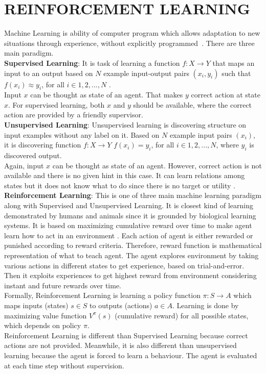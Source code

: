 \chapter{REINFORCEMENT LEARNING}
\label{chap:rl_chap}
Machine Learning is ability of computer program which allows adaptation to new situations through experience, without explicitly programmed~\cite{mitchell_machine_1997}. There are three main paradigm. \\
\textbf{Supervised Learning}: It is task of learning a function $f \colon X \rightarrow Y$ that maps an input to an output based on $N$ example input-output pairs $(x_i,y_i)$ such that $ f(x_i) \approx y_i$, for all $i \in {1,2,...,N}$ \cite{russell_artificial_nodate}. \\
Input $x$ can be thought as state of an agent. That makes $y$ correct action at state $x$. For supervised learning, both $x$ and $y$ should be available, where the correct action are provided by a friendly supervisor. \\
\textbf{Unsupervised Learning}:
Unsupervised learning is discovering structure on input examples without any label on it. Based on $N$ example input pairs $(x_i)$, it is discovering function $f \colon X \rightarrow Y$ $ f(x_i) = y_i$, for all $i \in {1,2,...,N} $, where $y_i$ is discovered output. \\
Again, input $x$ can be thought as state of an agent. However, correct action is not available and there is no given hint in this case. It can learn relations among states but it does not know what to do since there is no target or utility \cite{russell_artificial_nodate}. \\
\textbf{Reinforcement Learning}: This is one of three main machine learning paradigm along with Supervised and Unsupervised Learning. It is closest kind of learning demonstrated by humans and animals since it is grounded by biological learning systems. It is based on maximizing cumulative reward over time to make agent learn how to act in an environment \cite{sutton_reinforcement_1998}. Each action of agent is either rewarded or punished according to reward criteria. Therefore, reward function is mathematical representation of what to teach agent. The agent explores environment by taking various actions in different states to get experience, based on trial-and-error. Then it exploits experiences to get highest reward from environment considering instant and future rewards over time. \\
Formally, Reinforcement Learning is learning a policy function $\pi \colon S\rightarrow A$ which maps inputs (states) $s \in S$ to outputs (actions) $a \in A$. Learning is done by maximizing value function $V^{\pi}(s)$ (cumulative reward) for all possible states, which depends on policy $\pi$. \\
Reinforcement Learning is different than Supervised Learning because correct actions are not provided. Meanwhile, it is also different than unsupervised learning because the agent is forced to learn a behaviour. The agent is evaluated at each time step without supervision.